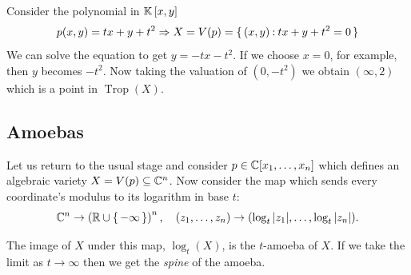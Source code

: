 \documentclass[12pt]{memoir}
\DeclareMathOperator{\Trop}{Trop}
\begin{document}
\begin{Ex}
    Consider the polynomial in $\mathbb{K}\left\lbrack x,y\right\rbrack$ 
    $$p(x,y)=tx+y+t^2\Rightarrow X=V(p)=\{\,(x,y)\mathbin{:} tx+y+t^2=0\,\}$$
    We can solve the equation to get $y=-tx-t^2$. If we choose $x=0$, for example, then $y$ becomes $-t^2$. Now taking the valuation of $(0,-t^2)$ we obtain $(\infty,2)$ which is a point in $\Trop(X)$.
\end{Ex}

\subsection{Amoebas}

Let us return to the usual stage and consider $p\in\mathbb{C}[x_1,\dots,x_n]$ which defines an algebraic variety $X=V(p)\subseteq\mathbb{C}^n$. Now consider the map which sends every coordinate's modulus to its logarithm in base $t$: 
$$\mathbb{C}^n\to\left(\mathbb{R}\cup\{\,-\infty\,\}\right)^n,\quad (z_1,\dots,z_n)\to(\log_t|z_1|,\dots,\log_t|z_n|).$$


The image of $X$ under this map, $\log_t(X)$, is the $t$-amoeba of $X$. If we take the limit as $t\to\infty$ then we get the \emph{spine} of the amoeba. 
\end{document}
